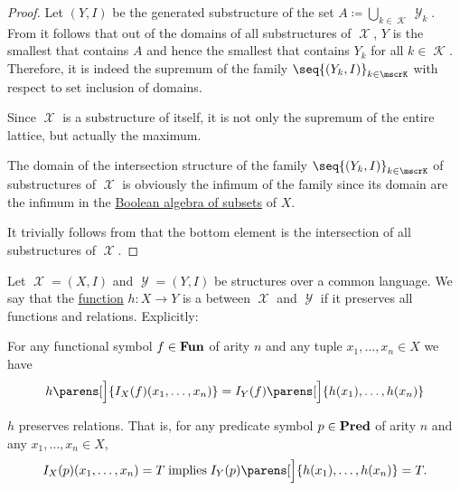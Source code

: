\begin{proof}
   Let \( (Y, I) \) be the generated substructure of the set \( A \coloneqq \bigcup_{k \in \mscrK} \mscrY_k \). From  it follows that out of the domains of all substructures of \( \mscrX \), \( Y \) is the smallest that contains \( A \) and hence the smallest that contains \( Y_k \) for all \( k \in \mscrK \). Therefore, it is indeed the supremum of the family \( \seq{ (Y_k, I) }_{k \in \mscrK} \) with respect to set inclusion of domains.

   Since \( \mscrX \) is a substructure of itself, it is not only the supremum of the entire lattice, but actually the maximum.

   The domain of the intersection structure of the family \( \seq{ (Y_k, I) }_{k \in \mscrK} \) of substructures of \( \mscrX \) is obviously the infimum of the family since its domain are the infimum in the \hyperref[thm:boolean_algebra_of_subsets]{Boolean algebra of subsets} of \( X \).

   It trivially follows from  that the bottom element is the intersection of all substructures of \( \mscrX \).
\end{proof}

\begin{definition}\label{def:first_order_homomorphism}
  Let \( \mscrX = (X, I) \) and \( \mscrY = (Y, I) \) be structures over a common language. We say that the \hyperref[def:function]{function} \( h: X \to Y \) is a  between \( \mscrX \) and \( \mscrY \) if it preserves all functions and relations. Explicitly:
  \begin{thmenum}
     For any functional symbol \( f \in \operatorname{\mathbf{Fun}} \) of arity \( n \) and any tuple \( x_1, \ldots, x_n \in X \) we have
    \begin{equation*}
      h\parens[\Big]{ I_X(f)(x_1, \ldots, x_n) } = I_Y(f) \parens[\Big]{ h(x_1), \ldots, h(x_n) }
    \end{equation*}

     \( h \) preserves relations. That is, for any predicate symbol \( p \in \operatorname{\mathbf{Pred}} \) of arity \( n \) and any \( x_1, \ldots, x_n \in X \),
    \begin{equation*}
      I_X(p) (x_1, \ldots, x_n) = T \T{implies} I_Y(p) \parens[\Big]{ h(x_1), \ldots, h(x_n) } = T.
    \end{equation*}
  \end{thmenum}
\end{definition}

